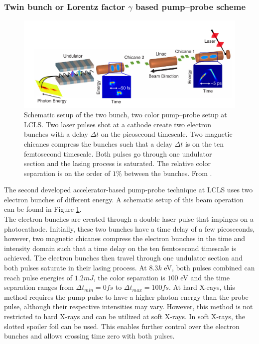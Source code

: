 \subsubsection{Twin bunch or Lorentz factor $\gamma$ based pump--probe scheme}
\begin{figure}
	\centering
		\includegraphics[width=1.00\textwidth]{images/Agos-pump-probe-scheme.png}
	\caption[Schematic setup of a bunch based pump-probe setup.]{Schematic setup of the two bunch, two color pump--probe setup at LCLS. Two laser pulses shot at a cathode create two electron bunches with a delay $\Delta t$ on the picosecond timescale. Two magnetic chicanes compress the bunches such that a delay $\Delta t$ is on the ten femtosecond timescale. Both pulses go through one undulator section and the lasing process is saturated. The relative color separation is on the order of $1\%$ between the bunches. From \citep[\href{http://creativecommons.org/licenses/by/4.0/}{\ccby}]{Marinelli-2015-NatComm}.}
	\label{fig:Agos-pump-probe-scheme}
\end{figure}
The second developed accelerator-based pump-probe technique at LCLS \cite{Marinelli-2015-NatComm} uses two electron bunches of different energy. A schematic setup of this beam operation can be found in Figure \ref{fig:Agos-pump-probe-scheme}.\\
The electron bunches are created through a double laser pulse that impinges on a photocathode. Initially, these two bunches have a time delay of a few picoseconds, however, two magnetic chicanes compress the electron bunches in the time and intensity domain such that a time delay on the ten femtosecond timescale is achieved. The electron bunches then travel through one undulator section and both pulses saturate in their lasing process. At $8.3k$ eV, both pulses combined can reach pulse energies of $1.2mJ$, the color separation is $100$ eV and the time separation ranges from $\Delta t_{min}=0fs$ to $\Delta t_{max}=100fs$. At hard X-rays, this method requires the pump pulse to have a higher photon energy than the probe pulse, although their respective intensities may vary. However, this method is not restricted to hard X-rays and can be utilized at soft X-rays. In soft X-rays, the slotted spoiler foil can be used. This enables further control over the electron bunches and allows crossing time zero with both pulses.
